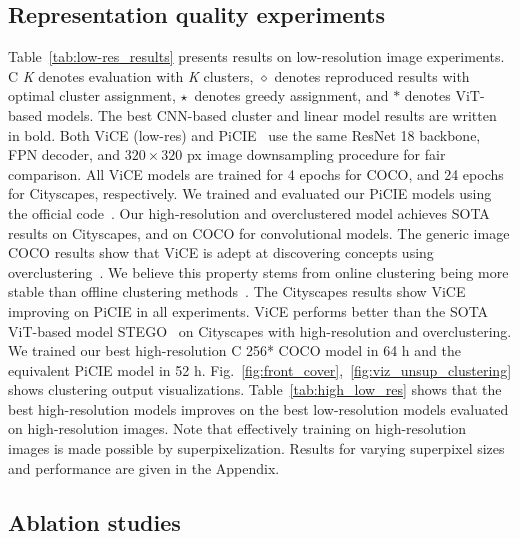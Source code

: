 \documentclass{bmvc2k}
\begin{document}
\subsection{Representation quality experiments}

Table~\ref{tab:low-res_results} presents results on low-resolution image experiments.  C \textit{K} denotes evaluation with \textit{K} clusters, $\diamond$ denotes reproduced results with optimal cluster assignment, $\star$~denotes greedy assignment, and $\ast$ denotes ViT-based models. The best CNN-based cluster and linear model results are written in bold. Both ViCE (low-res) and PiCIE~\cite{Cho2021PiCIE} use the same ResNet 18 backbone, FPN decoder, and $320 \times 320$ px image downsampling procedure for fair comparison. All ViCE models are trained for 4 epochs for COCO, and 24 epochs for Cityscapes, respectively. We trained and evaluated our PiCIE models using the official code~\cite{Cho2021PiCIE}.
Our high-resolution and overclustered model achieves SOTA results on Cityscapes, and on COCO for convolutional models. 
The generic image COCO results show that ViCE is adept at discovering concepts using overclustering~\cite{VanGansbeke2020LearningTC}. We believe this property stems from online clustering being more stable than offline clustering methods~\cite{Caron2020SwAV, Zhan2020OnlineDC}. The Cityscapes results show ViCE improving on PiCIE in all experiments. ViCE performs better than the SOTA ViT-based model STEGO~\cite{Hamilton2022STEGO} on Cityscapes with high-resolution and overclustering.
We trained our best high-resolution C 256* COCO model in 64 h and the equivalent PiCIE model in 52 h.
Fig.~\ref{fig:front_cover},~\ref{fig:viz_unsup_clustering} shows clustering output visualizations.
Table~\ref{tab:high_low_res} shows that the best high-resolution models improves on the best low-resolution models evaluated on high-resolution images. Note that effectively training on high-resolution images is made possible by superpixelization. Results for varying superpixel sizes and performance are given in the Appendix.

\subsection{Ablation studies}
\end{document}
